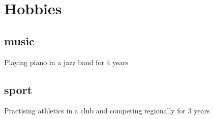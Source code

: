 \section{Hobbies}
\subsection{music}
Playing piano in a jazz band for 4 years%
~
~
\subsection{sport}
Practising athletics in a club and competing regionally for 3 years%